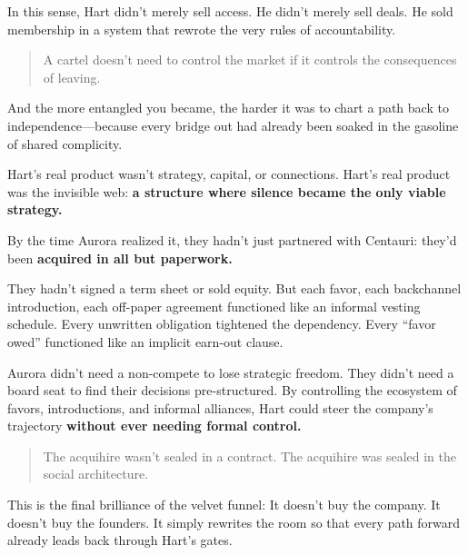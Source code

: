 In this sense, Hart didn’t merely sell access. He didn’t merely sell deals. He sold membership in a system that rewrote the very rules of accountability.

\begin{quote}
A cartel doesn’t need to control the market if it controls the consequences of leaving.
\end{quote}

And the more entangled you became, the harder it was to chart a path back to independence—because every bridge out had already been soaked in the gasoline of shared complicity.

Hart’s real product wasn’t strategy, capital, or connections.  
Hart’s real product was the invisible web:  
\textbf{a structure where silence became the only viable strategy.}

\medskip

By the time Aurora realized it, they hadn’t just partnered with Centauri: they’d been \textbf{acquired in all but paperwork.}  

They hadn’t signed a term sheet or sold equity. But each favor, each backchannel introduction, each off-paper agreement functioned like an informal vesting schedule. Every unwritten obligation tightened the dependency. Every “favor owed” functioned like an implicit earn-out clause.

Aurora didn’t need a non-compete to lose strategic freedom. They didn’t need a board seat to find their decisions pre-structured. By controlling the ecosystem of favors, introductions, and informal alliances, Hart could steer the company’s trajectory \textbf{without ever needing formal control.}

\begin{quote}
The acquihire wasn’t sealed in a contract.  
The acquihire was sealed in the social architecture.
\end{quote}

This is the final brilliance of the velvet funnel:  
It doesn’t buy the company. It doesn’t buy the founders.  
It simply rewrites the room so that every path forward already leads back through Hart’s gates.




